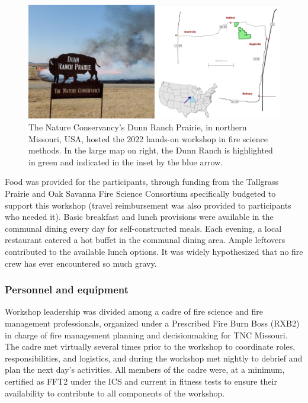 \documentclass[fire,article,submit,moreauthors,pdftex]{Definitions/mdpi}
\begin{document}
\begin{figure}
\centering
\includegraphics[width=1\columnwidth]{DunnRanchMap.png}
\caption{\label{DunnRanch}The Nature Conservancy's Dunn Ranch Prairie, in northern Missouri, USA, hosted the 2022 hands-on workshop in fire science methods. In the large map on right, the Dunn Ranch is highlighted in green and indicated in the inset by the blue arrow.}
\end{figure}

Food was provided for the participants, through funding from the Tallgrass Prairie and Oak Savanna Fire Science Consortium specifically budgeted to support this workshop (travel reimbursement was also provided to participants who needed it).
Basic breakfast and lunch provisions were available in the communal dining every day for self-constructed meals.
Each evening, a local restaurant catered a hot buffet in the communal dining area.
Ample leftovers contributed to the available lunch options.
It was widely hypothesized that no fire crew has ever encountered so much gravy.

\hypertarget{personnel-and-equipment}{%
\subsubsection{Personnel and equipment}\label{personnel-and-equipment}}

Workshop leadership was divided among a cadre of fire science and fire management professionals, organized under a Prescribed Fire Burn Boss (RXB2) in charge of fire management planning and decisionmaking for TNC Missouri.
The cadre met virtually several times prior to the workshop to coordinate roles, responsibilities, and logistics, and during the workshop met nightly to debrief and plan the next day's activities.
All members of the cadre were, at a minimum, certified as FFT2 under the ICS and current in fitness tests to ensure their availability to contribute to all components of the workshop.
\end{document}
